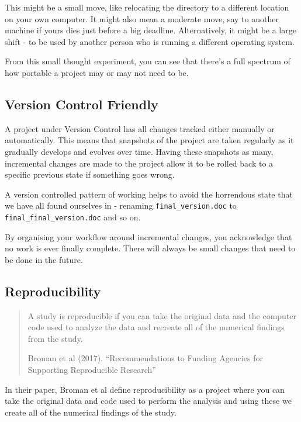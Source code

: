 \documentclass[
  letterpaper,
  DIV=11,
  numbers=noendperiod]{scrreprt}
\begin{document}
This might be a small move, like relocating the directory to a different
location on your own computer. It might also mean a moderate move, say
to another machine if yours dies just before a big deadline.
Alternatively, it might be a large shift - to be used by another person
who is running a different operating system.

From this small thought experiment, you can see that there's a full
spectrum of how portable a project may or may not need to be.

\subsection{Version Control Friendly}\label{version-control-friendly}

A project under Version Control has all changes tracked either manually
or automatically. This means that snapshots of the project are taken
regularly as it gradually develops and evolves over time. Having these
snapshots as many, incremental changes are made to the project allow it
to be rolled back to a specific previous state if something goes wrong.

A version controlled pattern of working helps to avoid the horrendous
state that we have all found ourselves in - renaming
\texttt{final\_version.doc} to \texttt{final\_final\_version.doc} and so
on.

By organising your workflow around incremental changes, you acknowledge
that no work is ever finally complete. There will always be small
changes that need to be done in the future.

\subsection{Reproducibility}\label{reproducibility}

\begin{quote}
A study is reproducible if you can take the original data and the
computer code used to analyze the data and recreate all of the numerical
findings from the study.

Broman et al (2017). ``Recommendations to Funding Agencies for
Supporting Reproducible Research''
\end{quote}

In their paper, Broman et al define reproducibility as a project where
you can take the original data and code used to perform the analysis and
using these we create all of the numerical findings of the study.
\end{document}
